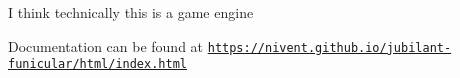 I think technically this is a game engine

Documentation can be found at \href{https://nivent.github.io/jubilant-funicular/html/index.html}{\tt https\+://nivent.\+github.\+io/jubilant-\/funicular/html/index.\+html} 